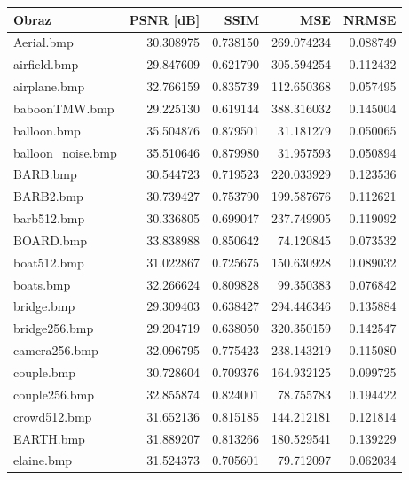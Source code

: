 \documentclass{article}
\begin{document}
\begin{table}[ht]
\centering
\begin{tabular}{@{}lrrrr@{}}
\toprule
Obraz              & PSNR {[}dB{]} & SSIM   & MSE      & NRMSE  \\ \midrule
        Aerial.bmp &  30.308975 &  0.738150 &  269.074234 &  0.088749 \\
      airfield.bmp &  29.847609 &  0.621790 &  305.594254 &  0.112432 \\
      airplane.bmp &  32.766159 &  0.835739 &  112.650368 &  0.057495 \\
     baboonTMW.bmp &  29.225130 &  0.619144 &  388.316032 &  0.145004 \\
       balloon.bmp &  35.504876 &  0.879501 &   31.181279 &  0.050065 \\
 balloon\_noise.bmp &  35.510646 &  0.879980 &   31.957593 &  0.050894 \\
          BARB.bmp &  30.544723 &  0.719523 &  220.033929 &  0.123536 \\
         BARB2.bmp &  30.739427 &  0.753790 &  199.587676 &  0.112621 \\
       barb512.bmp &  30.336805 &  0.699047 &  237.749905 &  0.119092 \\
         BOARD.bmp &  33.838988 &  0.850642 &   74.120845 &  0.073532 \\
       boat512.bmp &  31.022867 &  0.725675 &  150.630928 &  0.089032 \\
         boats.bmp &  32.266624 &  0.809828 &   99.350383 &  0.076842 \\
        bridge.bmp &  29.309403 &  0.638427 &  294.446346 &  0.135884 \\
     bridge256.bmp &  29.204719 &  0.638050 &  320.350159 &  0.142547 \\
     camera256.bmp &  32.096795 &  0.775423 &  238.143219 &  0.115080 \\
        couple.bmp &  30.728604 &  0.709376 &  164.932125 &  0.099725 \\
     couple256.bmp &  32.855874 &  0.824001 &   78.755783 &  0.194422 \\
      crowd512.bmp &  31.652136 &  0.815185 &  144.212181 &  0.121814 \\
         EARTH.bmp &  31.889207 &  0.813266 &  180.529541 &  0.139229 \\
        elaine.bmp &  31.524373 &  0.705601 &   79.712097 &  0.062034 \\

\end{tabular}
\end{table}
\end{document}
